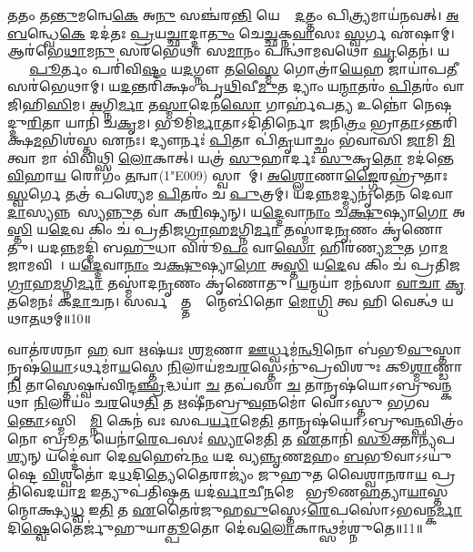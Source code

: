 \ul{𑌤}𑌤𑌂 𑌤\ul{𑌨𑍍𑌤𑍁}𑌮𑌨𑍍𑌵𑍇\ul{𑌕𑍇} 𑌅\ul{𑌨𑍁} 𑌸𑌞𑍍𑌚॑𑌰\ul{𑌨𑍍𑌤𑌿} 𑌯𑍇𑌷𑌾𑌂᳚ \ul{𑌦}𑌤𑍍𑌤𑌂 𑌪𑌿\ul{𑌤𑍍𑌰𑍍𑌯}𑌮𑌾𑌯॑𑌨𑌵𑌤𑍍। 
\ul{𑌅}\ul{𑌬}𑌨𑍍𑌧𑍍𑌵𑍇\ul{𑌕𑍇} 𑌦𑌦॑𑌤𑌃 \ul{𑌪𑍍𑌰}𑌯\ul{𑌚𑍍𑌛𑌾}𑌦𑍍𑌦𑌾\ul{𑌤𑍁𑌂} 𑌚𑍇\ul{𑌚𑍍𑌛}𑌕𑍍𑌨\ul{𑌵𑌾}\ul{}𑌸𑌃 \ul{𑌸𑍍𑌵}𑌰𑍍𑌗 𑌏॑𑌷𑌾𑌮𑍍। 
𑌆𑌰॑𑌭𑍇\ul{𑌥𑌾}𑌮\ul{𑌨𑍁} 𑌸𑌰॑𑌭𑍇𑌥𑌾 𑌸\ul{𑌮𑌾}𑌨𑌂 𑌪𑌨𑍍𑌥𑌾॑𑌮𑌵𑌥𑍋 \ul{𑌘𑍃}𑌤𑍇𑌨॑। 
𑌯𑌦𑍍𑌵𑌾𑌂᳚ \ul{𑌪𑍂}𑌰𑍍𑌤𑌂 𑌪𑌰𑌿॑𑌵𑌿\ul{𑌷𑍍𑌟𑌂} 𑌯\ul{𑌦}𑌗𑍍𑌨𑍗 𑌤\ul{𑌸𑍍𑌮𑍈} 𑌗𑍋𑌤𑍍𑌰𑌾॑\ul{𑌯𑍇}𑌹 𑌜𑌾𑌯𑌾॑𑌪\ul{𑌤𑍀} 𑌸𑌰॑𑌭𑍇𑌥𑌾𑌮𑍍। 
𑌯\ul{𑌦}𑌨𑍍𑌤𑌰𑌿॑𑌕𑍍𑌷𑌂 𑌪𑍃\ul{𑌥𑌿}𑌵𑍀\ul{𑌮𑍁}𑌤 𑌦𑍍𑌯𑌾𑌂 𑌯\ul{𑌨𑍍𑌮𑌾}𑌤𑌰𑌂॑ \ul{𑌪𑌿}𑌤𑌰𑌂॑ 𑌵𑌾 𑌜𑌿𑌹𑌿\ul{𑌸𑌿}𑌮। 
\ul{𑌅}𑌗𑍍𑌨𑌿\ul{𑌰𑍍𑌮𑌾} 𑌤\ul{𑌸𑍍𑌮𑌾}𑌦𑍇𑌨॑\ul{𑌸𑍋} 𑌗𑌾𑌰𑍍\mbox{}𑌹॑𑌪\ul{𑌤𑍍𑌯} 𑌉𑌨𑍍𑌨𑍋॑ 𑌨𑍇𑌷𑌦𑍍𑌦𑍁\ul{𑌰𑌿}𑌤𑌾 𑌯𑌾𑌨𑌿॑ 𑌚\ul{𑌕𑍃}𑌮। 
𑌭𑍂𑌮𑌿॑\ul{𑌰𑍍𑌮𑌾}𑌤𑌾𑌽𑌦𑌿॑𑌤𑌿𑌰𑍍𑌨𑍋 \ul{𑌜}𑌨𑌿\ul{𑌤𑍍𑌰𑌂} 𑌭𑍍𑌰𑌾\ul{𑌤𑌾}𑌽𑌨𑍍𑌤𑌰𑌿॑𑌕𑍍𑌷\ul{𑌮}𑌭𑌿𑌶॑𑌸𑍍𑌤 𑌏𑌨𑌃। 
𑌦𑍍𑌯𑍗𑌰𑍍𑌨𑌃॑ \ul{𑌪𑌿}𑌤𑌾 𑌪𑌿॑\ul{𑌤𑍃}𑌯𑌾𑌚𑍍𑌛𑌂 𑌭॑𑌵𑌾𑌸𑌿 \ul{𑌜𑌾}𑌮𑌿 \ul{𑌮𑌿}𑌤𑍍𑌵𑌾 𑌮𑌾 𑌵𑌿॑𑌵𑌿𑌥𑍍𑌸𑌿 \ul{𑌲𑍋}𑌕𑌾𑌤𑍍। 
𑌯𑌤𑍍𑌰॑ \ul{𑌸𑍁}𑌹𑌾𑌰𑍍𑌦𑌃॑ \ul{𑌸𑍁}𑌕𑍃\ul{𑌤𑍋} 𑌮𑌦॑𑌨𑍍𑌤𑍇 \ul{𑌵𑌿}𑌹𑌾\ul{𑌯} 𑌰𑍋𑌗𑌂॑ \ul{𑌤}𑌨𑍍𑌵𑌾(1\char"E009)\ul{} 𑌸𑍍𑌵𑌾𑌯𑌾᳚𑌮𑍍। 
\ul{𑌅}\ul{𑌶𑍍𑌲𑍋}𑌣𑌾\ul{𑌙𑍍𑌗𑍈}𑌰𑌹𑍍𑌰𑍁॑𑌤𑌾𑌃 \ul{𑌸𑍍𑌵}𑌰𑍍𑌗𑍇 𑌤𑌤𑍍𑌰॑ 𑌪𑌶𑍍𑌯𑍇𑌮 \ul{𑌪𑌿}𑌤𑌰𑌂॑ 𑌚 \ul{𑌪𑍁}𑌤𑍍𑌰𑌮𑍍। 
𑌯𑌦\ul{𑌨𑍍𑌨}𑌮𑌦𑍍𑌮𑍍𑌯𑌨𑍃॑𑌤𑍇𑌨 𑌦𑍇𑌵𑌾 \ul{𑌦𑌾}𑌸𑍍𑌯𑌨𑍍𑌨𑌦𑌾᳚𑌸𑍍𑌯\ul{𑌨𑍍𑌨𑍁}𑌤 𑌵𑌾॑ 𑌕\ul{𑌰𑌿}𑌷𑍍𑌯𑌨𑍍। 
𑌯\ul{𑌦𑍍𑌦𑍇}𑌵𑌾\ul{𑌨𑌾𑌂} 𑌚\ul{𑌕𑍍𑌷𑍁}𑌷𑍍𑌯𑌾\ul{𑌗𑍋} 𑌅\ul{𑌸𑍍𑌤𑌿} 𑌯\ul{𑌦𑍇}𑌵 𑌕𑌿𑌂 𑌚॑ 𑌪𑍍𑌰𑌤𑌿𑌜\ul{𑌗𑍍𑌰𑌾}𑌹\ul{𑌮}𑌗𑍍𑌨𑌿\ul{𑌰𑍍𑌮𑌾} 𑌤𑌸𑍍𑌮𑌾॑𑌦\ul{𑌨𑍃}𑌣𑌂 𑌕𑍃॑𑌣𑍋𑌤𑍁। 
𑌯𑌦\ul{𑌨𑍍𑌨}𑌮𑌦𑍍𑌮𑌿॑ 𑌬\ul{𑌹𑍁}𑌧𑌾 𑌵𑌿𑌰𑍂॑\ul{𑌪𑌂} 𑌵𑌾\ul{𑌸𑍋} 𑌹𑌿𑌰॑𑌣𑍍𑌯\ul{𑌮𑍁}𑌤 𑌗𑌾\ul{𑌮}𑌜𑌾𑌮𑌵𑌿𑌮𑍍᳚। 
𑌯\ul{𑌦𑍍𑌦𑍇}𑌵𑌾\ul{𑌨𑌾𑌂} 𑌚\ul{𑌕𑍍𑌷𑍁}𑌷𑍍𑌯𑌾\ul{𑌗𑍋} 𑌅\ul{𑌸𑍍𑌤𑌿} 𑌯\ul{𑌦𑍇}𑌵 𑌕𑌿𑌂 𑌚॑ 𑌪𑍍𑌰𑌤𑌿𑌜\ul{𑌗𑍍𑌰𑌾}𑌹\ul{𑌮}𑌗𑍍𑌨𑌿\ul{𑌰𑍍𑌮𑌾} 𑌤𑌸𑍍𑌮𑌾॑𑌦\ul{𑌨𑍃}𑌣𑌂 𑌕𑍃॑𑌣𑍋𑌤𑍁। 
\ul{𑌯}𑌨𑍍𑌮𑌯𑌾॑ 𑌮𑌨॑𑌸𑌾 \ul{𑌵𑌾}\ul{𑌚𑌾} \ul{𑌕𑍃}\ul{𑌤}𑌮𑍇𑌨𑌃॑ 𑌕\ul{𑌦𑌾}𑌚𑌨। 
𑌸𑌰𑍍𑌵𑌸𑍍𑌮𑌾᳚𑌤𑍍𑌤𑌸𑍍𑌮𑌾᳚𑌨𑍍𑌮𑍇𑌳𑌿॑𑌤𑍋 \ul{𑌮𑍋}\ul{𑌗𑍍𑌧𑌿} 𑌤𑍍𑌵 𑌹𑌿 𑌵𑍇𑌤𑍍𑌥॑ 𑌯𑌥𑌾\ul{𑌤}𑌥𑌮𑍍॥10॥\anuvakamend

𑌵𑌾𑌤॑𑌰𑌶𑌨𑌾 \ul{𑌹} 𑌵𑌾 𑌋𑌷॑𑌯𑌃 𑌶𑍍𑌰\ul{𑌮}𑌣𑌾 \ul{𑌊}𑌰𑍍𑌧𑍍𑌵𑌮॑\ul{𑌨𑍍𑌥𑌿}𑌨𑍋 𑌬॑𑌭𑍂\ul{𑌵𑍁}𑌸𑍍𑌤𑌾𑌨𑍃𑌷॑\ul{𑌯𑍋}\-𑌽𑌰𑍍𑌥𑌮𑌾॑\ul{𑌯}\ul{}𑌸𑍍𑌤𑍇 \ul{𑌨𑌿}𑌲𑌾𑌯॑𑌮𑌚\ul{𑌰}\ul{}𑌸𑍍𑌤𑍇𑌽𑌨𑍁॑𑌪𑍍𑌰𑌵𑌿𑌶𑍁𑌃 𑌕𑍂\ul{𑌶𑍍𑌮𑌾}𑌣𑍍𑌡𑌾\ul{𑌨𑌿} 𑌤𑌾𑌸𑍍𑌤𑍇𑌷𑍍𑌵𑌨𑍍𑌵॑𑌵𑌿𑌨𑍍𑌦\ul{𑌞𑍍𑌛𑍍𑌰}𑌦𑍍𑌧𑌯𑌾॑ \ul{𑌚} 𑌤𑌪॑𑌸𑌾 \ul{𑌚} 𑌤𑌾𑌨𑍃𑌷॑𑌯𑍋𑌽𑌬𑍍𑌰𑍁𑌵\ul{𑌨𑍍𑌕}𑌥𑌾 \ul{𑌨𑌿}𑌲𑌾𑌯𑌂॑ 𑌚\ul{𑌰}𑌥𑍇\ul{𑌤𑌿} 𑌤 𑌋𑌷𑍀॑𑌨𑌬𑍍𑌰𑍁\ul{𑌵}𑌨𑍍𑌨𑌮𑍋॑ 𑌵𑍋𑌽𑌸𑍍𑌤𑍁 𑌭𑌗𑌵\ul{𑌨𑍍𑌤𑍋}𑌽𑌸𑍍𑌮𑌿𑌨𑍍𑌧𑌾᳚\ul{𑌮𑍍𑌨𑌿} 𑌕𑍇𑌨॑ 𑌵𑌃 𑌸𑌪\ul{𑌰𑍍𑌯𑌾}𑌮𑍇\ul{𑌤𑌿} 𑌤𑌾𑌨𑍃𑌷॑𑌯𑍋𑌽𑌬𑍍𑌰𑍁𑌵\ul{𑌨𑍍𑌪}𑌵𑌿𑌤𑍍𑌰𑌂॑ 𑌨𑍋 𑌬𑍍𑌰𑍂\ul{𑌤} 𑌯𑍇𑌨𑌾॑\ul{𑌰𑍇}𑌪𑌸𑌃॑ \ul{𑌸𑍍𑌯𑌾}𑌮𑍇\ul{𑌤𑌿} 𑌤 \ul{𑌏}𑌤𑌾𑌨𑌿॑ \ul{𑌸𑍂}𑌕𑍍𑌤𑌾𑌨𑍍𑌯॑𑌪\ul{𑌶𑍍𑌯}𑌨𑍍 𑌯𑌦𑍍𑌦𑍇॑𑌵𑌾 𑌦𑍇\ul{𑌵}𑌹𑍇𑌳॑\ul{𑌨𑌂} 𑌯𑌦𑌦𑍀᳚𑌵𑍍𑌯\ul{𑌨𑍍𑌨𑍃}𑌣\ul{𑌮}𑌹𑌂 \ul{𑌬}𑌭𑍂𑌵𑌾𑌽𑌽𑌯𑍁॑𑌷𑍍𑌟𑍇 \ul{𑌵𑌿}𑌶𑍍𑌵𑌤𑍋॑ 𑌦\ul{𑌧}𑌦𑌿\ul{𑌤𑍍𑌯𑍇}𑌤𑍈𑌰𑌾𑌜𑍍𑌯𑌂॑ 𑌜𑍁𑌹𑍁𑌤 𑌵𑍈𑌶𑍍𑌵𑌾\ul{𑌨}𑌰𑌾\ul{𑌯} 𑌪𑍍𑌰𑌤𑌿॑𑌵𑍇𑌦𑌯𑌾\ul{𑌮} 𑌇𑌤𑍍𑌯𑍁𑌪॑𑌤𑌿𑌷𑍍𑌠\ul{𑌤} 𑌯𑌦॑\ul{𑌰𑍍𑌵𑌾}𑌚𑍀\ul{𑌨}𑌮𑍇𑌨𑍋᳚ 𑌭𑍍𑌰𑍂𑌣\ul{𑌹}𑌤𑍍𑌯𑌾\ul{𑌯𑌾}\-𑌸𑍍𑌤𑌸𑍍𑌮𑌾᳚𑌨𑍍𑌮𑍋𑌕𑍍𑌷𑍍𑌯\ul{𑌧𑍍𑌵} 𑌇\ul{𑌤𑌿} 𑌤 \ul{𑌏}𑌤𑍈𑌰॑𑌜𑍁𑌹\ul{𑌵𑍁}𑌸𑍍𑌤𑍇𑌽\ul{𑌰𑍇}𑌪𑌸𑍋॑\-𑌽𑌭𑌵𑌨𑍍𑌕\ul{𑌰𑍍𑌮𑌾}𑌦𑌿\ul{𑌷𑍍𑌵𑍇}𑌤𑍈𑌰𑍍𑌜𑍁॑𑌹𑍁𑌯𑌾\ul{𑌤𑍍𑌪𑍂}𑌤𑍋 𑌦𑍇॑𑌵\ul{𑌲𑍋}𑌕𑌾𑌨𑍍𑌥𑍍𑌸𑌮॑𑌶𑍍𑌨𑍁𑌤𑍇॥11॥\anuvakamend


